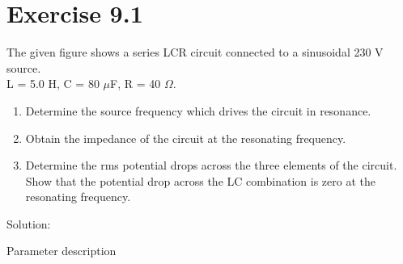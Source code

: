 \documentclass[journal,12pt,twocolumn]{IEEEtran}
\begin{document}


\vspace{3cm}

\title{}
\author{EE23BTECH11217 - Prajwal M$^{*}$
}
\maketitle
\newpage
\bigskip

\renewcommand{\thefigure}{\theenumi}
\renewcommand{\thetable}{\theenumi}

\section*{Exercise 9.1}
The given figure shows a series LCR circuit connected to a sinusoidal 230 V source. \\
L = 5.0 H, C = 80 $\mu$F, R = 40 $\Omega$.

\begin{figure}[h]

\end{figure}

\begin{enumerate}
    \item Determine the source frequency which drives the circuit in resonance.
    \item Obtain the impedance of the circuit
at the resonating frequency.
    \item Determine the rms potential drops across the three elements of
the circuit. Show that the potential drop across the LC
combination is zero at the resonating frequency.\\
\end{enumerate}

Solution:
\fi
\begin{table}[h]
    \centering
    
    \caption{Parameter description}
    \label{tab:217.tab.1}
\end{table}
\begin{figure}[h]
	
\end{figure}
\end{document}
